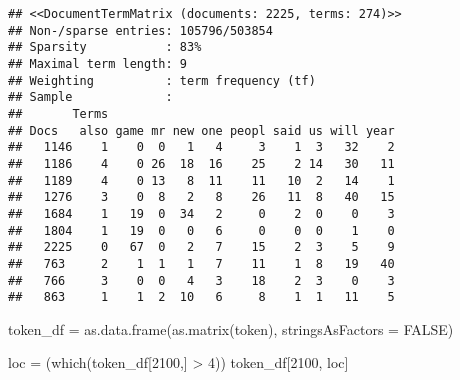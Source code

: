 \documentclass[
]{article}
\newenvironment{Shaded}{\begin{snugshade}}{\end{snugshade}}
\newcommand{\AttributeTok}[1]{\textcolor[rgb]{0.77,0.63,0.00}{#1}}
\newcommand{\ConstantTok}[1]{\textcolor[rgb]{0.00,0.00,0.00}{#1}}
\newcommand{\DecValTok}[1]{\textcolor[rgb]{0.00,0.00,0.81}{#1}}
\newcommand{\FloatTok}[1]{\textcolor[rgb]{0.00,0.00,0.81}{#1}}
\newcommand{\FunctionTok}[1]{\textcolor[rgb]{0.00,0.00,0.00}{#1}}
\newcommand{\NormalTok}[1]{#1}
\newcommand{\OtherTok}[1]{\textcolor[rgb]{0.56,0.35,0.01}{#1}}
\newcommand{\SpecialCharTok}[1]{\textcolor[rgb]{0.00,0.00,0.00}{#1}}
\newcommand{\StringTok}[1]{\textcolor[rgb]{0.31,0.60,0.02}{#1}}
\begin{document}
\begin{Shaded}
\end{Shaded}

\begin{verbatim}
## <<DocumentTermMatrix (documents: 2225, terms: 274)>>
## Non-/sparse entries: 105796/503854
## Sparsity           : 83%
## Maximal term length: 9
## Weighting          : term frequency (tf)
## Sample             :
##       Terms
## Docs   also game mr new one peopl said us will year
##   1146    1    0  0   1   4     3    1  3   32    2
##   1186    4    0 26  18  16    25    2 14   30   11
##   1189    4    0 13   8  11    11   10  2   14    1
##   1276    3    0  8   2   8    26   11  8   40   15
##   1684    1   19  0  34   2     0    2  0    0    3
##   1804    1   19  0   0   6     0    0  0    1    0
##   2225    0   67  0   2   7    15    2  3    5    9
##   763     2    1  1   1   7    11    1  8   19   40
##   766     3    0  0   4   3    18    2  3    0    3
##   863     1    1  2  10   6     8    1  1   11    5
\end{verbatim}

\begin{Shaded}
\begin{Highlighting}[]
\NormalTok{token\_df }\OtherTok{=} \FunctionTok{as.data.frame}\NormalTok{(}\FunctionTok{as.matrix}\NormalTok{(token), }\AttributeTok{stringsAsFactors =} \ConstantTok{FALSE}\NormalTok{)}

\NormalTok{loc }\OtherTok{=}\NormalTok{ (}\FunctionTok{which}\NormalTok{(token\_df[}\DecValTok{2100}\NormalTok{,] }\SpecialCharTok{\textgreater{}} \DecValTok{4}\NormalTok{))}
\NormalTok{token\_df[}\DecValTok{2100}\NormalTok{, loc]}
\end{Highlighting}
\end{Shaded}
\end{document}
